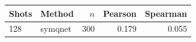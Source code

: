 \begin{tabular}{llrrr}
\toprule
Shots & Method & $n$ & Pearson & Spearman \\
\midrule
128 & symqnet & 300 & 0.179 & 0.055 \\
\bottomrule
\end{tabular}
